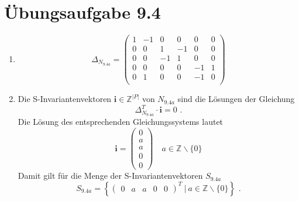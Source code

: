 \documentclass[a4paper]{scrartcl}
\begin{document}
\begin{enumerate}
\begin{itemize}
                

        \end{itemize}
        

\end{enumerate}

\section*{Übungsaufgabe 9.4} 
\begin{enumerate}
    \item
        \begin{equation}
            \Delta_{N_{9.4a}} =
            \begin{pmatrix}
                 1 & -1 &  0 &  0 &  0 &  0 \\
                 0 &  0 &  1 & -1 &  0 &  0 \\
                 0 &  0 & -1 &  1 &  0 &  0 \\
                 0 &  0 &  0 &  0 & -1 &  1 \\
                 0 &  1 &  0 &  0 & -1 &  0 \\
            \end{pmatrix}
        \end{equation}
        

    \item
        Die S-Invariantenvektoren $\textbf{i} \in \mathbb{Z}^{|P|}$ von $N_{9.4a}$ sind
        die Lösungen der Gleichung
        \begin{equation}
            \Delta_{N_{9.4a}}^T \cdot \textbf{i} = 0 \text{ .}
        \end{equation}
        Die Lösung des entsprechenden Gleichungssystems lautet
        \begin{equation}
            \textbf{i} =
            \begin{pmatrix}
                0 \\ a \\ a \\ 0 \\ 0
            \end{pmatrix}
            \quad
            a \in \mathbb{Z} \backslash \{ 0 \}
        \end{equation}
        Damit gilt für die Menge der S-Invariantenvektoren $S_{9.4a}$
        \begin{equation}
            S_{9.4a} = \left\{ 
                \begin{pmatrix}
                    0 & a & a & 0 & 0
                \end{pmatrix}^T
                \ \vert \ 
                a \in \mathbb{Z} \backslash \{ 0 \}
            \right\}
            \text{ .}
        \end{equation}
        

\end{enumerate}
\end{document}
